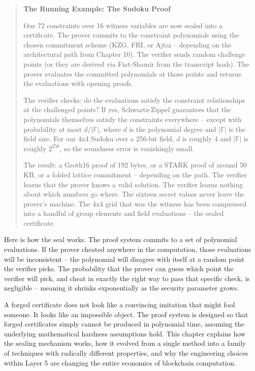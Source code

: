 \documentclass[
  11pt,
  openany]{report}
\renewcommand{\textbf}[1]{{\bfseries\color{MidnightBold}#1}}
\begin{document}
\begin{quote}
\textbf{The Running Example: The Sudoku Proof}

Our 72 constraints over 16 witness variables are now sealed into a certificate.
The prover commits to the constraint polynomials using the chosen commitment
scheme (KZG, FRI, or Ajtai -- depending on the architectural path from Chapter
10). The verifier sends random challenge points (or they are derived via
Fiat-Shamir from the transcript hash). The prover evaluates the committed
polynomials at those points and returns the evaluations with opening proofs.

The verifier checks: do the evaluations satisfy the constraint relationships at
the challenged points? If yes, Schwartz-Zippel guarantees that the polynomials
themselves satisfy the constraints everywhere -- except with probability at most
\(d/|\mathbb{F}|\), where \(d\) is the polynomial degree and \(|\mathbb{F}|\) is
the field size. For our 4x4 Sudoku over a 256-bit field, \(d\) is roughly 4 and
\(|\mathbb{F}|\) is roughly \(2^{256}\), so the soundness error is vanishingly
small.

The result: a Groth16 proof of 192 bytes, or a STARK proof of around 50 KB, or a
folded lattice commitment -- depending on the path. The verifier learns that the
prover knows a valid solution. The verifier learns nothing about which numbers
go where. The sixteen secret values never leave the prover's machine. The 4x4
grid that was the witness has been compressed into a handful of group elements
and field evaluations -- the sealed certificate.
\end{quote}

Here is how the seal works. The proof system commits to a set of polynomial
evaluations. If the prover cheated anywhere in the computation, those
evaluations will be inconsistent -- the polynomial will disagree with itself at
a random point the verifier picks. The probability that the prover can guess
which point the verifier will pick, and cheat in exactly the right way to pass
that specific check, is negligible -- meaning it shrinks exponentially as the
security parameter grows.

A forged certificate does not look like a convincing imitation that might fool
someone. It looks like an impossible object. The proof system is designed so
that forged certificates simply cannot be produced in polynomial time, assuming
the underlying mathematical hardness assumptions hold. This chapter explains how
the sealing mechanism works, how it evolved from a single method into a family
of techniques with radically different properties, and why the engineering
choices within Layer 5 are changing the entire economics of blockchain
computation.
\end{document}
